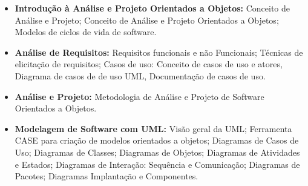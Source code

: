 \begin{itemize}

  \item \textbf{Introdução à Análise e Projeto Orientados a Objetos:} Conceito de Análise e Projeto; Conceito de Análise e Projeto Orientados a Objetos; Modelos de ciclos de vida de software.
 
  \item \textbf{Análise de Requisitos:} Requisitos funcionais e não Funcionais;	Técnicas de elicitação de requisitos; Casos de uso: Conceito de casos de uso e atores, Diagrama de casos de de uso UML, Documentação de casos de uso.
 
  \item \textbf{Análise e Projeto:} Metodologia de Análise e Projeto de Software Orientados a Objetos.
  
  \item \textbf{Modelagem de Software com UML:} Visão geral da UML; Ferramenta CASE para criação de modelos orientados a objetos; Diagramas de Casos de Uso; Diagramas de Classes; Diagramas de Objetos; Diagramas de Atividades e Estados;  Diagramas de Interação: Sequência e Comunicação; Diagramas de Pacotes; Diagramas Implantação e Componentes.

\end{itemize}









